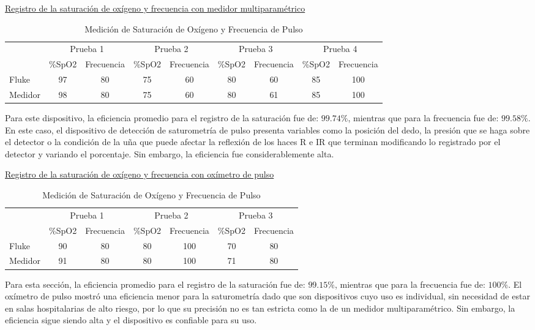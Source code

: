 \underline{Registro de la saturación de oxígeno y frecuencia con medidor multiparamétrico}
\begin{table}[H]
\centering
\caption{Medición de Saturación de Oxígeno y Frecuencia de Pulso}
\begin{tabular}{lcccccccc}
\toprule
 & \multicolumn{2}{c}{Prueba 1} & \multicolumn{2}{c}{Prueba 2} & \multicolumn{2}{c}{Prueba 3} & \multicolumn{2}{c}{Prueba 4} \\
\cmidrule(lr){2-3} \cmidrule(lr){4-5} \cmidrule(lr){6-7} \cmidrule(lr){8-9}
 & \%SpO2 & Frecuencia & \%SpO2 & Frecuencia & \%SpO2 & Frecuencia & \%SpO2 & Frecuencia \\
\midrule
Fluke   & 97 & 80 & 75 & 60 & 80 & 60 & 85 & 100 \\
Medidor & 98 & 80 & 75 & 60 & 80 & 61 & 85 & 100 \\
\bottomrule
\end{tabular}
\end{table}

Para este dispositivo, la eficiencia promedio para el registro de la saturación fue de: $99.74 \%$, mientras que para la frecuencia fue de: $99.58 \%$. En este caso, el dispositivo de detección de saturometría de pulso presenta variables como la posición del dedo, la
presión que se haga sobre el detector o la condición de la uña que puede afectar la reflexión de los haces R e IR que terminan modificando lo registrado por el detector y variando el porcentaje. Sin embargo, la eficiencia fue considerablemente alta.

\underline{Registro de la saturación de oxígeno y frecuencia con oxímetro de pulso}
\begin{table}[H]
\centering
\caption{Medición de Saturación de Oxígeno y Frecuencia de Pulso}
\begin{tabular}{lcccccc}
\toprule
 & \multicolumn{2}{c}{Prueba 1} & \multicolumn{2}{c}{Prueba 2} & \multicolumn{2}{c}{Prueba 3} \\
\cmidrule(lr){2-3} \cmidrule(lr){4-5} \cmidrule(lr){6-7}
 & \%SpO2 & Frecuencia & \%SpO2 & Frecuencia & \%SpO2 & Frecuencia \\
\midrule
Fluke   & 90 & 80 & 80 & 100 & 70 & 80 \\
Medidor & 91 & 80 & 80 & 100 & 71 & 80 \\
\bottomrule
\end{tabular}
\end{table}

Para esta sección, la eficiencia promedio para el registro de la saturación fue de: $99.15 \%$, mientras que para la frecuencia fue de: $100 \%$. El oxímetro de pulso mostró una eficiencia menor para la saturometría dado que son dispositivos cuyo uso
es individual, sin necesidad de estar en salas hospitalarias de alto riesgo, por lo que su precisión no es tan estricta como la de un medidor multiparamétrico. Sin embargo, la eficiencia sigue siendo alta y el dispositivo es confiable para su uso.
